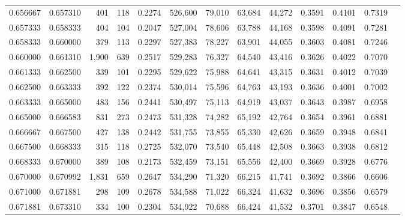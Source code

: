 \begin{tabular}{rrrrrrrrrrrrr}
0.656667 & 0.657310 &   401 & 118 &                                     0.2274 & 526,600 &  79,010 &  63,684 &  44,272 & 0.3591 & 0.4101 & 0.7319 \\
0.657333 & 0.658333 &   404 & 104 &                                     0.2047 & 527,004 &  78,606 &  63,788 &  44,168 & 0.3598 & 0.4091 & 0.7281 \\
0.658333 & 0.660000 &   379 & 113 &                                     0.2297 & 527,383 &  78,227 &  63,901 &  44,055 & 0.3603 & 0.4081 & 0.7246 \\
0.660000 & 0.661310 & 1,900 & 639 &                                     0.2517 & 529,283 &  76,327 &  64,540 &  43,416 & 0.3626 & 0.4022 & 0.7070 \\
0.661333 & 0.662500 &   339 & 101 &                                     0.2295 & 529,622 &  75,988 &  64,641 &  43,315 & 0.3631 & 0.4012 & 0.7039 \\
0.662500 & 0.663333 &   392 & 122 &                                     0.2374 & 530,014 &  75,596 &  64,763 &  43,193 & 0.3636 & 0.4001 & 0.7002 \\
0.663333 & 0.665000 &   483 & 156 &                                     0.2441 & 530,497 &  75,113 &  64,919 &  43,037 & 0.3643 & 0.3987 & 0.6958 \\
0.665000 & 0.666583 &   831 & 273 &                                     0.2473 & 531,328 &  74,282 &  65,192 &  42,764 & 0.3654 & 0.3961 & 0.6881 \\
0.666667 & 0.667500 &   427 & 138 &                                     0.2442 & 531,755 &  73,855 &  65,330 &  42,626 & 0.3659 & 0.3948 & 0.6841 \\
0.667500 & 0.668333 &   315 & 118 &                                     0.2725 & 532,070 &  73,540 &  65,448 &  42,508 & 0.3663 & 0.3938 & 0.6812 \\
0.668333 & 0.670000 &   389 & 108 &                                     0.2173 & 532,459 &  73,151 &  65,556 &  42,400 & 0.3669 & 0.3928 & 0.6776 \\
0.670000 & 0.670992 & 1,831 & 659 &                                     0.2647 & 534,290 &  71,320 &  66,215 &  41,741 & 0.3692 & 0.3866 & 0.6606 \\
0.671000 & 0.671881 &   298 & 109 &                                     0.2678 & 534,588 &  71,022 &  66,324 &  41,632 & 0.3696 & 0.3856 & 0.6579 \\
0.671881 & 0.673310 &   334 & 100 &                                     0.2304 & 534,922 &  70,688 &  66,424 &  41,532 & 0.3701 & 0.3847 & 0.6548 \\

\end{tabular}
